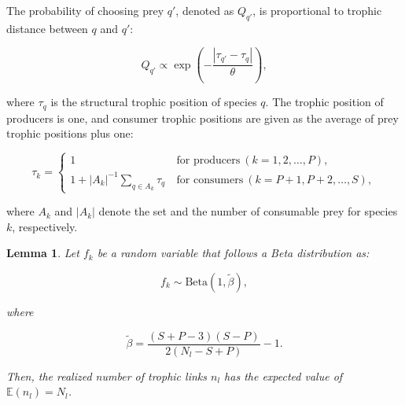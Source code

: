 \documentclass[11pt, class=article, crop=false]{standalone}
\newtheorem{lemma}{Lemma}[subsection]
\theoremstyle{definition}
\begin{document}
The probability of choosing prey $q'$, denoted as $Q_{q'}$, is proportional to trophic distance between $q$ and $q'$:

\begin{equation}
    Q_{q'} 
    \propto 
    \exp
    \left(
    -\frac{|\tau_{q'} - \tau_q|}{\theta}
    \right),
\end{equation}

where $\tau_q$ is the structural trophic position of species $q$.
The trophic position of producers is one, and
consumer trophic positions are given as the average of prey trophic positions plus one:

\begin{equation}
\tau_k = 
    \begin{cases}
    1 
    & ~\text{for producers}~ (k=1, 2, \ldots, P),\\
    1 + |A_{k}|^{-1} \sum_{q \in A_{k}} \tau_q 
    & ~\text{for consumers}~ (k = P+1, P+2, \ldots, S),
    \end{cases}
\end{equation}

where $A_{k}$ and $|A_{k}|$ denote the set and the number of consumable prey for species $k$, respectively.

\begin{lemma}
\label{lemma-beta-tilde}
    Let $f_k$ be a random variable that follows a Beta distribution as:

    \begin{equation}
        f_k \sim \mathrm{Beta}(1, \tilde{\beta}),
    \end{equation}

    where

    \begin{equation}
        \tilde{\beta} = \frac{(S + P - 3)(S - P)}{2(N_l - S + P)} - 1.
        \label{eq:beta-tilde}
    \end{equation}

    Then, the realized number of trophic links $n_l$ has the expected value of $\mathbb{E}(n_l) = N_l$.
\end{lemma}
\end{document}
